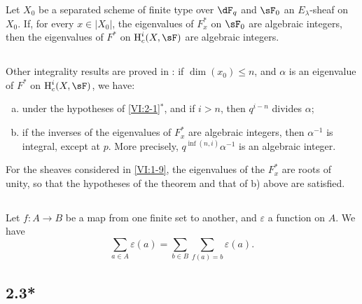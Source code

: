 \begin{theorem*}[2.1*]\label{VI:2-1*}
Let $X_0$ be a separated scheme of finite type over $\dF_q$ and $\sF_0$ an
$E_\lambda$-sheaf on $X_0$. If, for every $x\in |X_0|$, the eigenvalues
of $F_x^\ast$ on $\sF_0$ are algebraic integers, then the
eigenvalues of $F^\ast$ on $\h_c^i(X,\sF)$ are algebraic integers.
\end{theorem*}





\subsection{}\label{VI:2-2}

Other integrality results are proved in
\cite[XXI, 5.2.2 et 5.4]{sga7}: if $\dim(x_0)\leqslant n$, and $\alpha$ is
an eigenvalue of $F^\ast$ on $\h_c^i(X,\sF)$, we have:
\begin{enumerate}[a)]
  \item under the hypotheses of \ref{VI:2-1}$^\ast$, and if $i>n$, then
    $q^{i-n}$ divides $\alpha$;
  \item if the inverses of the eigenvalues of $F_x^\ast$ are algebraic
    integers, then $\alpha^{-1}$ is integral, except at $p$. More
    precisely, $q^{\inf(n,i)}\alpha^{-1}$ is an algebraic integer.
\end{enumerate}

For the sheaves considered in \ref{VI:1-9}, the eigenvalues of the
$F_x^\ast$ are roots of unity, so that the hypotheses of the
theorem and that of b) above are satisfied. 





\subsection{}\label{VI:2-3}

Let $f:A\to B$ be a map from one finite set to another, and
$\varepsilon$ a function on $A$. We have 
\begin{equation*}\tag{2.3.1}\label{VI:eq:2-3-1}
  \sum_{a\in A} \varepsilon(a) = \sum_{b\in B} \sum_{f(a)=b} \varepsilon(a) \text{.}
\end{equation*}





\subsection*{2.3*}\label{VI:2-3*}

